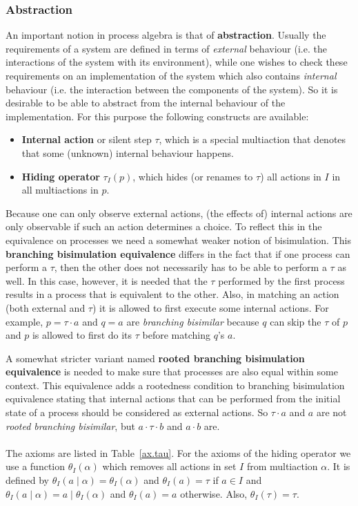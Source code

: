 \documentclass[a4paper,fleqn]{article}
\newcommand{\deffont}[1]{\textbf{#1}}
\newcommand{\seq}{\mathbin{\cdot}}
\newcommand{\sync}{\mathbin{\!\mid\!}}
\newcommand{\hide}[1]{\tau_{#1}}
\begin{document}
\subsubsection{Abstraction}
\label{sssec:abstraction}

An important notion in process algebra is that of \deffont{abstraction}.
Usually the requirements of a system are defined in terms of {\it external}
behaviour (i.e. the interactions of the system with its environment), while one
wishes to check these requirements on an implementation of the system which
also contains {\it internal} behaviour (i.e. the interaction between the
components of the system). So it is desirable to be able to abstract from the
internal behaviour of the implementation. For this purpose the following
constructs are available:

\begin{itemize}
\item \deffont{Internal action} or silent step $\tau$, which is a special
multiaction that denotes that some (unknown) internal behaviour happens.

\item \deffont{Hiding operator} $\hide{I}(p)$, which hides (or renames to
$\tau$) all actions in $I$ in all multiactions in $p$.

\end{itemize}

\noindent
Because one can only observe external actions, (the effects of) internal
actions are only observable if such an action determines a choice. To reflect
this in the equivalence on processes we need a somewhat weaker notion of
bisimulation. This \deffont{branching bisimulation equivalence} differs in the
fact that if one process can perform a $\tau$, then the other does not
necessarily has to be able to perform a $\tau$ as well. In this case, however,
it is needed that the $\tau$ performed by the first process results in a
process that is equivalent to the other. Also, in matching an action (both
external and $\tau$) it is allowed to first execute some internal actions. For
example, $p=\tau\seq a$ and $q=a$ are {\it branching bisimilar} because $q$ can
skip the $\tau$ of $p$ and $p$ is allowed to first do its $\tau$ before
matching $q$'s $a$. 

A somewhat stricter variant named \deffont{rooted branching bisimulation
equivalence} is needed to make sure that processes are also equal within some
context. This equivalence adds a rootedness condition to branching bisimulation
equivalence stating that internal actions that can be performed from the
initial state of a process should be considered as external actions. So
$\tau\seq a$ and $a$ are not {\it rooted branching bisimilar}, but
$a\seq\tau\seq b$ and $a\seq b$ are.
\\
\\
\noindent
The axioms are listed in Table~\ref{ax.tau}. For the axioms of the hiding
operator we use a function $\theta_I(\alpha)$ which removes all actions in set
$I$ from multiaction $\alpha$. It is defined by
$\theta_I(a\sync\alpha)=\theta_I(\alpha)$ and $\theta_I(a)=\tau$ if $a\in I$
and $\theta_I(a\sync\alpha)=a\sync\theta_I(\alpha)$ and $\theta_I(a)=a$
otherwise. Also, $\theta_I(\tau)=\tau$.
\end{document}
